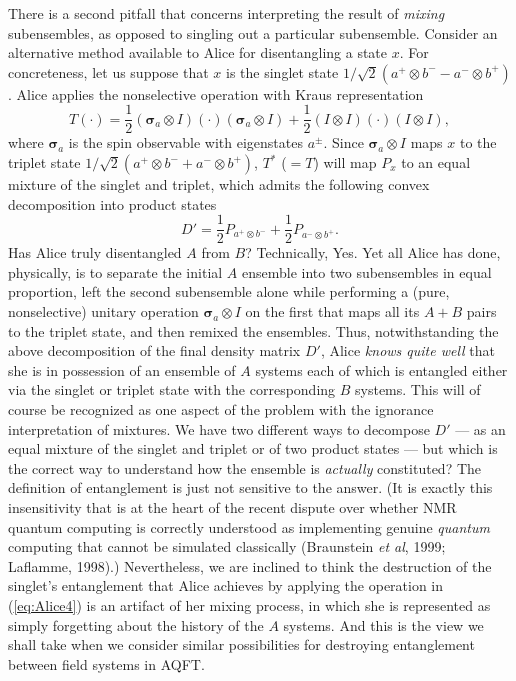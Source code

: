 \documentclass[12pt]{article}
\begin{document}
There is a second pitfall that 
concerns interpreting the result of 
\emph{mixing} 
subensembles, as opposed to singling out a particular 
subensemble. Consider an alternative method available to 
Alice for disentangling a state $x$.  For 
concreteness, let us suppose that $x$ is the singlet state 
$1/\sqrt{2}(a^{+}\otimes b^{-}-a^{-}\otimes b^{+})$. Alice applies the 
nonselective operation with Kraus representation
\begin{equation} \label{eq:Alice4}
T(\cdot)=\frac{1}{2}(\mathbf{\sigma}_{a}\otimes I) (\cdot 
)(\mathbf{\sigma}_{a}\otimes 
I)+\frac{1}{2}(I\otimes I) (\cdot)(I\otimes I),
\end{equation} 
where $\mathbf{\sigma}_{a}$ is the spin observable with eigenstates $a^{\pm}$.
 Since $\mathbf{\sigma}_{a}\otimes I$ maps $x$ to the triplet state 
 $1/\sqrt{2}(a^{+}\otimes b^{-}+a^{-}\otimes b^{+})$, $T^{*}$ ($=T$) 
 will map $P_{x}$ 
to an equal mixture of the singlet and triplet, which admits the 
following convex decomposition into product states
\begin{equation}  \label{eq:Alice3}
D' = \frac{1}{2}P_{a^{+}\otimes b^{-}}+\frac{1}{2}P_{a^{-}\otimes 
b^{+}}.
\end{equation}
Has Alice truly disentangled $A$ from $B$?  Technically, Yes.
Yet all Alice has done, physically, is to separate the initial $A$ ensemble into 
two subensembles in equal proportion, left the second 
subensemble alone while performing a (pure, nonselective) unitary operation 
$\mathbf{\sigma}_{a}\otimes I$ 
on the 
first that maps all its $A+B$ pairs to the triplet state, and then 
remixed the ensembles.  Thus, notwithstanding the above decomposition of the 
final density matrix $D'$, Alice \emph{knows quite well} that she is 
in possession of an ensemble of $A$ systems each of which is 
entangled either via the singlet or triplet state with the 
corresponding $B$ systems.  This will of course be recognized as one 
aspect of the problem with the ignorance interpretation of mixtures.  
We have two different ways to decompose $D'$ --- as an equal mixture 
of the singlet and triplet or of two product states --- but which is 
the correct way to understand how the ensemble is \emph{actually} 
constituted?  The definition of entanglement is just not sensitive to the 
answer.  (It is exactly this insensitivity that is at 
the heart of the recent dispute over whether NMR quantum computing 
is correctly understood as implementing genuine \emph{quantum} computing that cannot be simulated 
classically (Braunstein \emph{et al}, 1999; Laflamme, 1998).)  Nevertheless, we are inclined to think the destruction of 
the singlet's 
entanglement that 
Alice achieves by applying the 
operation in (\ref{eq:Alice4}) is an artifact of her mixing process, in which she is 
represented as simply forgetting 
about the history of the $A$ systems.  
And this is the view we shall take when we consider similar 
possibilities for destroying entanglement between field systems in AQFT. 
  
\end{document}
